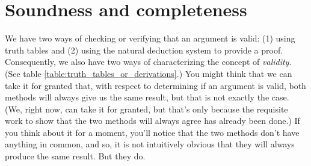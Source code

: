

\chapter{Soundness and completeness}
\label{sec:soundness_and_completeness}


We have two ways of checking or verifying that an argument is valid: (1) using truth tables and (2) using the natural deduction system to provide a proof. Consequently, we also have two ways of characterizing the concept of \textit{validity}. (See table \ref{table:truth_tables_or_derivations}.)
You might think that we can take it for granted that, with respect to determining if an argument is valid, both methods will always give us the same result, but that is not exactly the case. (We, right now, can take it for granted, but that's only because the requisite work to show that the two methods will always agree has already been done.) If you think about it for a moment, you'll notice that the two methods don't have anything in common, and so, it is not intuitively obvious that they will always produce the same result. But they do.



